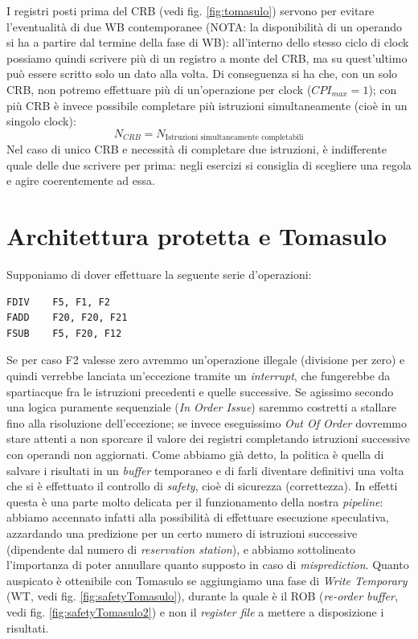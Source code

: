 I registri posti prima del CRB (vedi fig. \ref{fig:tomasulo}) servono per evitare l'eventualità di due WB contemporanee (NOTA: la disponibilità di un operando si ha a partire dal termine della fase di WB): all'interno dello stesso ciclo di clock possiamo quindi scrivere più di un registro a monte del CRB, ma su quest'ultimo può essere scritto solo un dato alla volta.
Di conseguenza si ha che, con un solo CRB, non potremo effettuare più di un'operazione per clock ($CPI_{max} =1$); con più CRB è invece possibile completare più istruzioni simultaneamente (cioè in un singolo clock):
\[
N_{CRB} = N_{\text{Istruzioni simultaneamente completabili}}
\]
Nel caso di unico CRB e necessità di completare due istruzioni, è indifferente quale delle due scrivere per prima: negli esercizi si consiglia di scegliere una regola e agire coerentemente ad essa.

\section{Architettura protetta e Tomasulo}
\label{sec:protectedTomasulo}

Supponiamo di dover effettuare la seguente serie d'operazioni:
\begin{verbatim}
FDIV    F5, F1, F2
FADD    F20, F20, F21
FSUB    F5, F20, F12
\end{verbatim}
Se per caso F2 valesse zero avremmo un'operazione illegale (divisione per zero) e quindi verrebbe lanciata un'eccezione tramite un \textit{interrupt}, che fungerebbe da spartiacque fra le istruzioni precedenti e quelle successive. Se agissimo secondo una logica puramente sequenziale (\textit{In Order Issue}) saremmo costretti a stallare fino alla risoluzione dell'eccezione; se invece eseguissimo \textit{Out Of Order} dovremmo stare attenti a   non sporcare il valore dei registri completando istruzioni successive con operandi non aggiornati. Come abbiamo già detto, la politica è quella di salvare i risultati in un \textit{buffer} temporaneo e di farli diventare definitivi una volta che si è effettuato il controllo di \textit{safety}, cioè di sicurezza (correttezza). In effetti questa è una parte molto delicata per il funzionamento della nostra \textit{pipeline}: abbiamo accennato infatti alla possibilità di effettuare esecuzione speculativa, azzardando una predizione per un certo numero di istruzioni successive (dipendente dal numero di \textit{reservation station}), e abbiamo sottolineato l'importanza di poter annullare quanto supposto in caso di \textit{misprediction}. Quanto auspicato è ottenibile con Tomasulo se aggiungiamo una fase di \textit{Write Temporary} (WT, vedi fig. \ref{fig:safetyTomasulo}), durante la quale è il ROB (\textit{re-order buffer}, vedi fig. \ref{fig:safetyTomasulo2}) e non il \textit{register file} a mettere a disposizione i risultati.

